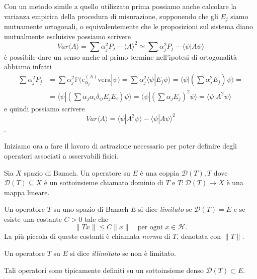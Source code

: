 Con un metodo simile a quello utilizzato prima possiamo anche calcolare la varianza empirica della procedura di misurazione, supponendo che gli $E_j$ siamo mutuamente ortogonali, o equivalentemente che le proposizioni sul sistema diano mutualmente escluisive possiamo scrivere $$Var\langle A \rangle = \sum \alpha_j^2 P_j - \langle A \rangle^2 \simeq \sum \alpha_j^2 P_j - \langle \psi | A \psi \rangle $$ è possibile dare un senso anche al primo termine nell'ipotesi di ortogonalità abbiamo infatti 
\begin{align*} 
\sum \alpha^2_j P_j &= \sum \alpha^2_j \mathbb{P} (e^{(A)}_{\alpha_j} \text{vera}|\psi) = \sum \alpha^2_j \langle \psi | E_j \psi \rangle = \langle \psi | (\sum \alpha^2_j E_j) \psi \rangle = \\
&= \langle \psi | (\sum \alpha_j \alpha_i \delta_{ij} E_j E_i) \psi \rangle = \langle \psi | (\sum \alpha_j E_j)^2 \psi \rangle = \langle \psi | A^2 \psi \rangle
\end{align*} 
e quindi possiamo scrivere $$Var\langle A \rangle = \langle \psi | A^2 \psi \rangle - \langle \psi | A \psi \rangle^2$$. 


Iniziamo ora a fare il lavoro di astrazione necessario per poter definire degli operatori associati a osservabili fisici.


\begin{definition}
    Sia $X$ spazio di Banach. Un operatore su $E$ è una coppia $\mathcal{D}(T), T$ dove $\mathcal{D}(T) \subseteq X$ è un sottoinsieme chiamato dominio di $T$ e $T : \mathcal{D}(T) \to X$ è una mappa lineare. 
\end{definition}


\begin{definition}
Un operatore $T$ su uno spazio di Banach $E$ si dice \emph{limitato} se $\mathcal{D}(T)= E$ e se esiste una costante $C > 0$ tale che
\[
\|T x\| \leq C \|x\| \quad \text{per ogni } x \in \mathcal{H}.
\]
La più piccola di queste costanti è chiamata \emph{norma} di $T$, denotata con $\|T\|$.
\end{definition}


\begin{definition}
Un operatore $T$ su $E$ si dice \emph{illimitato} se non è limitato.
\end{definition} 
Tali operatori sono tipicamente definiti su un sottoinsieme denso $\mathcal{D}(T) \subset E$. 

